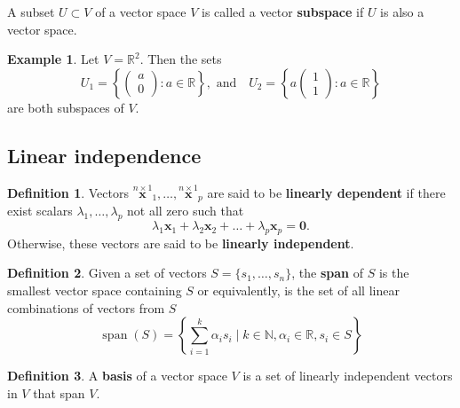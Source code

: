 \documentclass[]{book}
\theoremstyle{definition}
\newtheorem{definition}{Definition}[chapter]
\theoremstyle{definition}
\newtheorem{example}{Example}[chapter]
\theoremstyle{definition}
\theoremstyle{remark}
\begin{document}
A subset \(U \subset V\) of a vector space \(V\) is called a vector \textbf{subspace} if \(U\) is also a vector space.

\begin{example}
\protect\hypertarget{exm:Rp2}{}{\label{exm:Rp2} }Let \(V=\mathbb{R}^2\). Then the sets \[U_1 = \left\{\left(
        \begin{array}{c}
        a\\
      0  \end{array}
        \right): a\in \mathbb{R}\right\}, \mbox{ and}\quad U_2 = \left\{a\left(
        \begin{array}{c}
       1 \\
      1  \end{array}
        \right): a\in \mathbb{R}\right\}\]
are both subspaces of \(V\).
\end{example}

\hypertarget{linear-independence}{%
\subsection{Linear independence}\label{linear-independence}}

\begin{definition}
\protect\hypertarget{def:linindep}{}{\label{def:linindep} }Vectors \(\stackrel{n\times 1}{\mathbf x}_1 ,\dots , \stackrel{n\times 1}{\mathbf x}_p\)
are said to be \textbf{linearly dependent} if there exist scalars
\(\lambda _1, \dots ,\lambda _p\) not all zero such that
\[ \lambda _1 {\mathbf x}_1+\lambda _2 {\mathbf x}_2+ \dots + \lambda _p {\mathbf x}_p={\mathbf 0}.\]
Otherwise, these vectors are said to be \textbf{linearly independent}.
\end{definition}

\begin{definition}
\protect\hypertarget{def:span}{}{\label{def:span} }Given a set of vectors \(S=\{s_1, \ldots, s_n\}\), the \textbf{span} of \(S\) is the smallest vector space containing \(S\) or equivalently, is the set of all linear combinations of vectors from \(S\)
\[\operatorname{span}(S) = \left\{ \sum_{i=1}^k \alpha_i s_i \mid k \in \mathbb{N}, \alpha_i \in \mathbb{R}, s_i \in S\right\}\]
\end{definition}

\begin{definition}
\protect\hypertarget{def:basis}{}{\label{def:basis} }A \textbf{basis} of a vector space \(V\) is a set of linearly independent vectors in \(V\) that span \(V\).
\end{definition}
\end{document}
